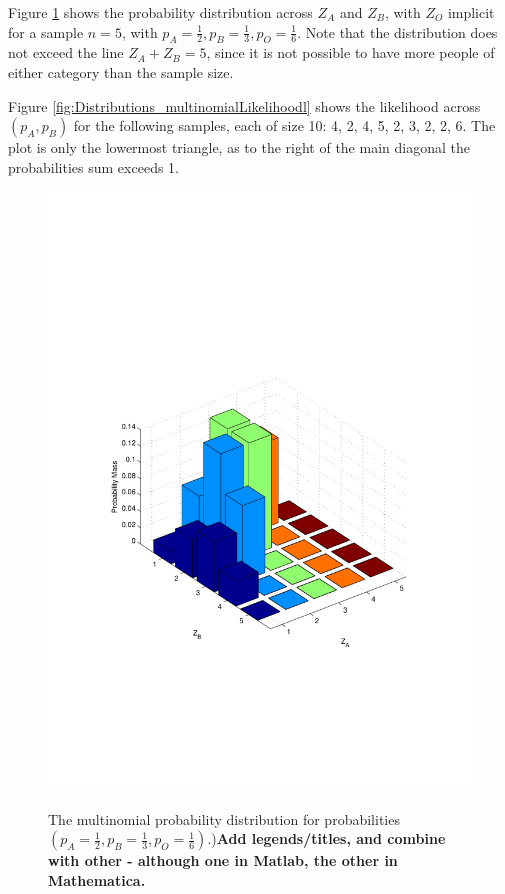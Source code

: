 \documentclass[11pt,fullpage]{book}
\begin{document}
Figure \ref{fig:Distributions_multinomial} shows the probability distribution across $Z_A$ and $Z_B$, with $Z_O$ implicit for a sample $n=5$, with $p_A=\frac{1}{2},p_B=\frac{1}{3},p_O=\frac{1}{6}$. Note that the distribution does not exceed the line $Z_A+Z_B=5$, since it is not possible to have more people of either category than the sample size.

Figure \ref{fig:Distributions_multinomialLikelihoodl} shows the likelihood across $(p_A,p_B)$ for the following samples, each of size 10: {{4, 2, 4}, {5, 2, 3}, {2, 2, 6}}. The plot is only the lowermost triangle, as to the right of the main diagonal the probabilities sum exceeds 1.

\begin{figure}
\centering
\scalebox{0.3} 
{\includegraphics{Distributions_multinomial.pdf}}
\caption{The multinomial probability distribution for probabilities $(p_A=\frac{1}{2},p_B=\frac{1}{3},p_O = \frac{1}{6})$.)\textbf{Add legends/titles, and combine with other - although one in Matlab, the other in Mathematica.}}\label{fig:Distributions_multinomial}
\end{figure}
\end{document}
